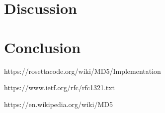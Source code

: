 \documentclass{article}
\begin{document}
\section{Discussion}

\section{Conclusion}


\bigskip





https://rosettacode.org/wiki/MD5/Implementation

https://www.ietf.org/rfc/rfc1321.txt  

https://en.wikipedia.org/wiki/MD5  
\end{document}
